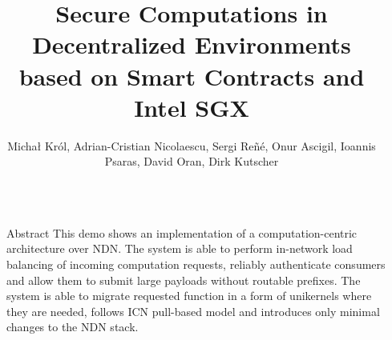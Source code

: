 \documentclass[final]{beamer}
\title{Secure Computations in Decentralized Environments \\based on Smart Contracts and Intel SGX} %
\author{Michał Król, Adrian-Cristian Nicolaescu, Sergi Reñé, Onur Ascigil, Ioannis Psaras, David Oran, Dirk Kutscher} %
\institute{University College London, Network Systems Research \& Design, Huawei} %
\newlength{\sepwid}
\newlength{\onecolwid}
\begin{document}

\setlength{\belowcaptionskip}{2ex} %
\setlength\belowdisplayshortskip{2ex} %

\begin{frame}[t] %

\begin{columns}[t] %

\begin{column}{\sepwid}\end{column} %

\begin{column}{\onecolwid} %


\begin{alertblock}{Abstract}
This demo shows an implementation of a computation-centric architecture over NDN. The system is able to perform in-network load balancing of incoming computation requests, reliably authenticate consumers and allow them to submit large payloads without routable prefixes. The system is able to migrate requested function in a form of unikernels where they are needed, follows ICN pull-based model and introduces only minimal changes to the NDN stack.



\end{alertblock}


\end{column}
\end{columns}
\end{frame}
\end{document}
